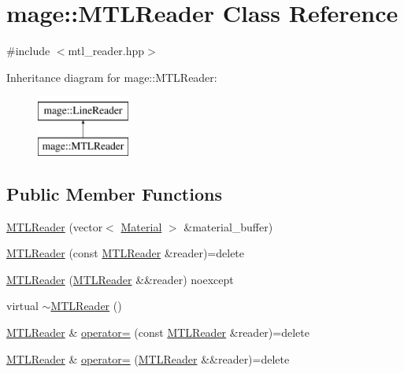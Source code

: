 \hypertarget{classmage_1_1_m_t_l_reader}{}\section{mage\+:\+:M\+T\+L\+Reader Class Reference}
\label{classmage_1_1_m_t_l_reader}


{\ttfamily \#include $<$mtl\+\_\+reader.\+hpp$>$}

Inheritance diagram for mage\+:\+:M\+T\+L\+Reader\+:\begin{figure}[H]
\begin{center}
\leavevmode
\includegraphics[height=2.000000cm]{classmage_1_1_m_t_l_reader}
\end{center}
\end{figure}
\subsection*{Public Member Functions}
\begin{DoxyCompactItemize}
\item 
\hyperlink{classmage_1_1_m_t_l_reader_a924f813cca170e2592a6e7d2a3255be8}{M\+T\+L\+Reader} (vector$<$ \hyperlink{classmage_1_1_material}{Material} $>$ \&material\+\_\+buffer)
\item 
\hyperlink{classmage_1_1_m_t_l_reader_adcc57156298b2198c24c041503df2e6d}{M\+T\+L\+Reader} (const \hyperlink{classmage_1_1_m_t_l_reader}{M\+T\+L\+Reader} \&reader)=delete
\item 
\hyperlink{classmage_1_1_m_t_l_reader_a436d06f44afe2d6a275119223ebf5f1f}{M\+T\+L\+Reader} (\hyperlink{classmage_1_1_m_t_l_reader}{M\+T\+L\+Reader} \&\&reader) noexcept
\item 
virtual \hyperlink{classmage_1_1_m_t_l_reader_a9d3216b2637bc9402d37c7438860f542}{$\sim$\+M\+T\+L\+Reader} ()
\item 
\hyperlink{classmage_1_1_m_t_l_reader}{M\+T\+L\+Reader} \& \hyperlink{classmage_1_1_m_t_l_reader_ae239ac085326919918a418edabcafeae}{operator=} (const \hyperlink{classmage_1_1_m_t_l_reader}{M\+T\+L\+Reader} \&reader)=delete
\item 
\hyperlink{classmage_1_1_m_t_l_reader}{M\+T\+L\+Reader} \& \hyperlink{classmage_1_1_m_t_l_reader_aa777389ff4a3cd2f1df2cbf5c6da708e}{operator=} (\hyperlink{classmage_1_1_m_t_l_reader}{M\+T\+L\+Reader} \&\&reader)=delete
\end{DoxyCompactItemize}
